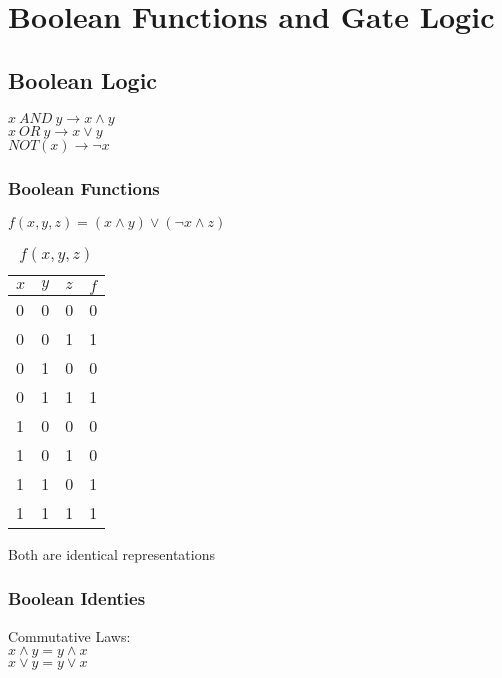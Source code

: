 \chapter{Boolean Functions and Gate Logic}

\section{Boolean Logic}

$x\ AND\ y \rightarrow x \land y$\\
$x\ OR\ y \rightarrow x \lor y$\\
$NOT(x) \rightarrow \neg x$\\

\subsection{Boolean Functions}

$f(x, y, z) = (x \land y) \lor (\neg x \land z)$

\begin{table}[h!]
    \begin{center} 
        \caption{$f(x, y, z)$}
        \label{tab:fxyz}
        \begin{tabular}{l|l|l|l}
            $x$ & $y$ & $z$ & $f$\\
            \hline
            0 & 0 & 0 & 0\\
            0 & 0 & 1 & 1\\
            0 & 1 & 0 & 0\\
            0 & 1 & 1 & 1\\
            1 & 0 & 0 & 0\\
            1 & 0 & 1 & 0\\
            1 & 1 & 0 & 1\\
            1 & 1 & 1 & 1\\
        \end{tabular}
    \end{center}
\end{table}

Both are identical representations

\subsection{Boolean Identies}

Commutative Laws:\\

$x \land y = y \land x$\\
$x \lor y = y \lor x$\\

